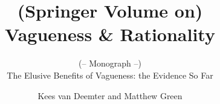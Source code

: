 \documentclass[graybox,envcountchap,sectrefs%
,footinfo
]{svmono}
\begin{document}
\author{Kees van Deemter and Matthew Green}
\title{(Springer Volume on)\\Vagueness \& Rationality}
\subtitle{(-- Monograph --)\\ The Elusive Benefits of Vagueness: the Evidence So Far}
\maketitle

\frontmatter%

%
%
%
%

\tableofcontents




\mainmatter%


%
%

\backmatter%

%
\printindex

\end{document}
